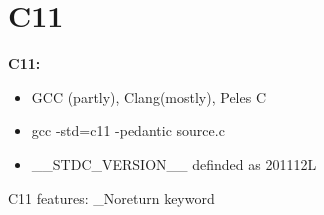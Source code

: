 \section{C11}
\begin{frame}{}
    \begin{block}{ \begin{Huge} \textbf{C11:} \end{Huge}}
        \bigskip
        \bigskip
        \bigskip
        \begin{itemize}
            \item GCC (partly), Clang(mostly), Peles C
            \pause\item gcc -std=c11 -pedantic source.c
            \pause\item \_\_STDC\_VERSION\_\_ definded as 201112L
        \end{itemize}
        \bigskip
        \bigskip
        \bigskip
    \end{block}
\end{frame}
%    
\begin{frame}{C11 features: \_Noreturn keyword}
\end{frame}
